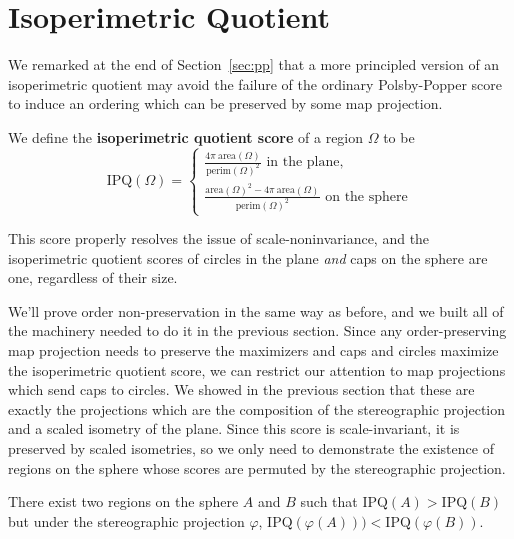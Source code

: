 \section{Isoperimetric Quotient}\label{sec:isoper}



We remarked at the end of Section~\ref{sec:pp} that a more principled version of an isoperimetric quotient may avoid the failure of the ordinary Polsby-Popper score to induce an ordering which can be preserved by some map projection.

\begin{definition}
We define the \textbf{isoperimetric quotient score} of a region $\Omega$ to be$$
\mathrm{IPQ}(\Omega)=
\begin{cases}
\frac{4\pi \ \mathrm{area}(\Omega)}{\mathrm{perim}(\Omega)^2} \text{ in the plane},\\[10pt]
\frac{\mathrm{area}(\Omega)^2 - 4\pi \ \mathrm{area}(\Omega)}{\mathrm{perim}(\Omega)^2}\text{ on the sphere}
\end{cases}
$$
\end{definition}

This score properly resolves the issue of scale-noninvariance, and the isoperimetric quotient scores of circles in the plane \textit{and} caps on the sphere are one, regardless of their size.

We'll prove order non-preservation in the same way as before, and we built all of the machinery needed to do it in the previous section.  Since any order-preserving map projection needs to preserve the maximizers and caps and circles maximize the isoperimetric quotient score, we can restrict our attention to map projections which send caps to circles.  We showed in the previous section that these are exactly the projections which are the composition of the stereographic projection and a scaled isometry of the plane.  Since this score is scale-invariant, it is preserved by scaled isometries, so we only need to demonstrate the existence of regions on the sphere whose scores are permuted by the stereographic projection.


\begin{theorem}
There exist two regions on the sphere $A$ and $B$ such that $\mathrm{IPQ}(A)>\mathrm{IPQ}(B)$ but under the stereographic projection $\varphi$, $\mathrm{IPQ}(\varphi(A)))<\mathrm{IPQ}(\varphi(B))$.
\end{theorem}


